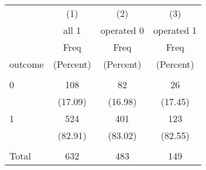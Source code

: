 \begin{tabular}{lccc} \hline
 & (1) & (2) & (3) \\
 & all 1 & operated 0 & operated 1 \\
 & Freq & Freq & Freq \\
outcome & (Percent) & (Percent) & (Percent) \\ \hline
 &  &  &  \\
0 & 108 & 82 & 26 \\
 & (17.09) & (16.98) & (17.45) \\
1 & 524 & 401 & 123 \\
 & (82.91) & (83.02) & (82.55) \\
 &  &  &  \\
 Total & 632 & 483 & 149 \\ \hline
\end{tabular}
